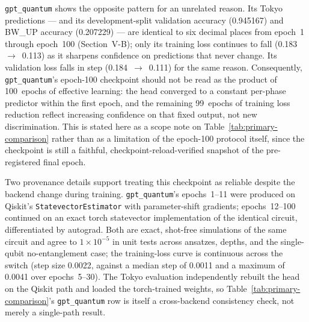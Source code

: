 \texttt{gpt\_quantum} shows the opposite pattern for an unrelated reason. Its Tokyo predictions --- and its development-split validation accuracy (0.945167) and BW\_UP accuracy (0.207229) --- are identical to six decimal places from epoch~1 through epoch~100 (Section~V-B); only its training loss continues to fall (0.183~$\to$~0.113) as it sharpens confidence on predictions that never change. Its validation loss falls in step (0.184~$\to$~0.111) for the same reason. Consequently, \texttt{gpt\_quantum}'s epoch-100 checkpoint should not be read as the product of 100~epochs of effective learning: the head converged to a constant per-phase predictor within the first epoch, and the remaining 99~epochs of training loss reduction reflect increasing confidence on that fixed output, not new discrimination. This is stated here as a scope note on Table~\ref{tab:primary-comparison} rather than as a limitation of the epoch-100 protocol itself, since the checkpoint is still a faithful, checkpoint-reload-verified snapshot of the pre-registered final epoch.

Two provenance details support treating this checkpoint as reliable despite the backend change during training. \texttt{gpt\_quantum}'s epochs~1--11 were produced on Qiskit's \texttt{StatevectorEstimator} with parameter-shift gradients; epochs~12--100 continued on an exact torch statevector implementation of the identical circuit, differentiated by autograd. Both are exact, shot-free simulations of the same circuit and agree to $1\times10^{-5}$ in unit tests across ansatzes, depths, and the single-qubit no-entanglement case; the training-loss curve is continuous across the switch (step size 0.0022, against a median step of 0.0011 and a maximum of 0.0041 over epochs~5--30). The Tokyo evaluation independently rebuilt the head on the Qiskit path and loaded the torch-trained weights, so Table~\ref{tab:primary-comparison}'s \texttt{gpt\_quantum} row is itself a cross-backend consistency check, not merely a single-path result.

